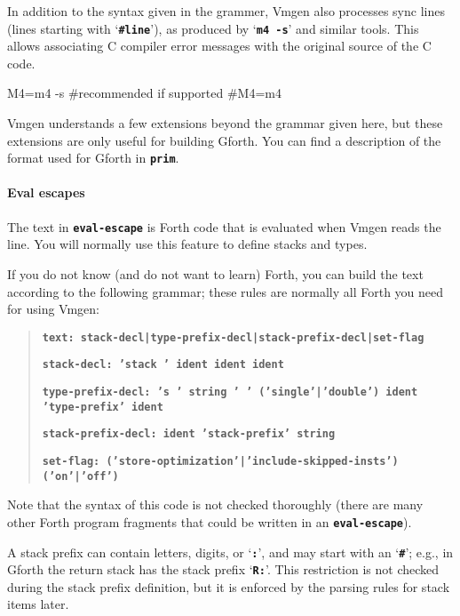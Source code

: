 \documentclass[10pt,english]{article}
\begin{document}
In addition to the syntax given in the grammer, Vmgen also processes
sync lines (lines starting with \textquoteleft{}\texttt{\textbf{\#line}}\textquoteright{}),
as produced by \textquoteleft{}\texttt{\textbf{m4 -s}}\textquoteright{}
and similar tools. This allows associating C compiler error messages
with the original source of the C code.

\nwenddocs{}\endmoddef
M4=m4 -s #recommended if supported
#M4=m4
\nwendcode{}\nwdocspar

Vmgen understands a few extensions beyond the grammar given here,
but these extensions are only useful for building Gforth. You can
find a description of the format used for Gforth in \texttt{\textbf{prim}}.


\paragraph{Eval escapes\label{par:Eval-escapes}}

The text in \texttt{\textbf{eval-escape}} is Forth code that is evaluated
when Vmgen reads the line. You will normally use this feature to define
stacks and types.

If you do not know (and do not want to learn) Forth, you can build
the text according to the following grammar; these rules are normally
all Forth you need for using Vmgen:
\begin{quotation}
\texttt{\textbf{text: stack-decl|type-prefix-decl|stack-prefix-decl|set-flag}}

\texttt{\textbf{stack-decl: 'stack ' ident ident ident}}

\texttt{\textbf{type-prefix-decl: 's\textquotedbl{} ' string '\textquotedbl{}
' ('single'|'double') ident 'type-prefix' ident}}

\texttt{\textbf{stack-prefix-decl: ident 'stack-prefix' string}}

\texttt{\textbf{set-flag: ('store-optimization'|'include-skipped-insts')
('on'|'off')}}
\end{quotation}
Note that the syntax of this code is not checked thoroughly (there
are many other Forth program fragments that could be written in an
\texttt{\textbf{eval-escape}}).

A stack prefix can contain letters, digits, or \textquoteleft{}\texttt{\textbf{:}}\textquoteright{},
and may start with an \textquoteleft{}\texttt{\textbf{\#}}\textquoteright{};
e.g., in Gforth the return stack has the stack prefix \textquoteleft{}\texttt{\textbf{R:}}\textquoteright{}.
This restriction is not checked during the stack prefix definition,
but it is enforced by the parsing rules for stack items later.
\end{document}
